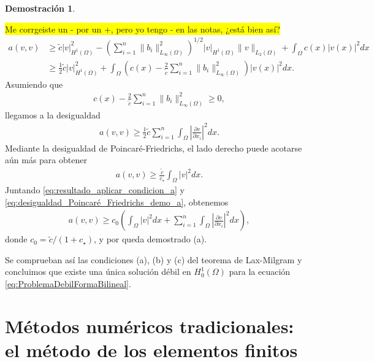 \documentclass[a4paper,11pt,spanish, twoside, leqno]{tfg-uam}
\theoremstyle{definition}
\newtheorem{dem}[teor]{Demostración}
\begin{document}
\begin{dem}
\begin{itemize}
        \colorbox{yellow}{Me corrgeiste un - por un +, pero yo tengo - en las notas, ¿está bien así?}
        \begin{align*}
        a(v, v) &\geq \tilde{c} |v|^2_{H^1(\Omega)} - 
        \left( \sum_{i=1}^{n} \|b_i\|^2_{L_{\infty}(\Omega)} \right)^{1/2} 
        |v|_{H^1(\Omega)} \|v\|_{L_2(\Omega)} 
        + \int_{\Omega} c(x) |v(x)|^2 dx \\
        &\geq \frac{1}{2} \tilde{c} |v|^2_{H^1(\Omega)} 
        + \int_{\Omega} \left( c(x) - \frac{2}{\tilde{c}} \sum_{i=1}^{n} \|b_i\|^2_{L_{\infty}(\Omega)} \right) |v(x)|^2 dx.
        \end{align*}
        Asumiendo que 
        \begin{align*}
        c(x) - \frac{2}{\tilde{c}} \sum_{i=1}^{n} \|b_i\|^2_{L_{\infty}(\Omega)} \geq 0,
        \end{align*}
        llegamos a la desigualdad 
        \begin{align}\label{eq:resultado_aplicar_condicion_a}
        a(v, v) \geq \frac{1}{2} \tilde{c} \sum_{i=1}^{n} \int_{\Omega} \left| \frac{\partial v}{\partial x_i} \right|^2 dx.
        \end{align}
        Mediante la desigualdad de Poincaré-Friedrichs, el lado derecho puede acotarse aún más para obtener
        \begin{align}\label{eq:desigualdad_Poincaré_Friedrichs_demo_a}
        a(v, v) \geq \frac{\tilde{c}}{c_{\star}} \int_{\Omega} |v|^2 dx.
        \end{align}
        Juntando \eqref{eq:resultado_aplicar_condicion_a} y \eqref{eq:desigualdad_Poincaré_Friedrichs_demo_a}, obtenemos
        \begin{align}
        a(v, v) \geq c_0 \left( \int_{\Omega} |v|^2 dx + \sum_{i=1}^{n} \int_{\Omega} \left| \frac{\partial v}{\partial x_i} \right|^2 dx \right),
        \end{align}
        donde $c_0 = \tilde{c}/(1 + c_{\star})$, y por queda demostrado (a).
    \end{itemize}
    Se comprueban así las condiciones (a), (b) y (c) del teorema de Lax-Milgram y concluimos que existe una única solución débil en $H^1_0(\Omega)$ para la ecuación \eqref{eq:ProblemaDebilFormaBilineal}.
\end{dem}

\section{Métodos numéricos tradicionales: el método de los elementos finitos}\label{sc:FEM}
\end{document}

